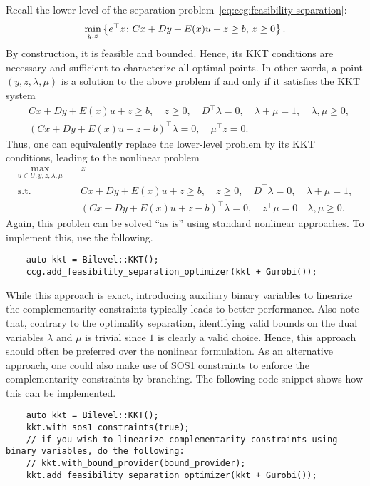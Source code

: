 
Recall the lower level of the separation
problem~\eqref{eq:ccg:feasibility-separation}:
\begin{equation*}
    \min_{y,z} \left\{ e^\top z \colon
        Cx + Dy + E(x)u + z \ge b, \, 
        z \ge 0
    \right\}.
\end{equation*}
By construction, it is feasible and bounded. Hence, its KKT conditions are
necessary and sufficient to characterize all optimal points. In other words, a
point $(y,z,\lambda,\mu)$ is a solution to the above problem if and only if it
satisfies the KKT system 
\begin{align*}
    & Cx + Dy + E(x)u + z \ge b, \quad z \ge 0, \quad 
    D^\top \lambda = 0, \quad \lambda + \mu = 1, \quad \lambda,\mu \ge 0, \\
    & (Cx + Dy + E(x)u + z - b)^\top\lambda = 0, \quad \mu^\top z = 0.
\end{align*}
Thus, one can equivalently replace the lower-level problem by its KKT
conditions, leading to the nonlinear problem 
\begin{align*}
    \max_{u\in U,y,z,\lambda,\mu} \quad & z \\
    \text{s.t.} \quad 
    & Cx + Dy + E(x)u + z \ge b, \quad z \ge 0, \quad 
    D^\top \lambda = 0, \quad \lambda + \mu = 1, \\
    & (Cx + Dy + E(x)u + z - b)^\top\lambda = 0, \quad z^\top\mu = 0 \quad \lambda,\mu \ge 0.
\end{align*}
Again, this problen can be solved ``as is'' using standard nonlinear
approaches. To implement this, use the following.
%
\begin{lstlisting}
    auto kkt = Bilevel::KKT();
    ccg.add_feasibility_separation_optimizer(kkt + Gurobi());
\end{lstlisting}

While this approach is exact, introducing auxiliary binary variables to
linearize the complementarity constraints typically leads to better
performance. Also note that, contrary to the optimality separation,
identifying valid bounds on the dual variables $\lambda$ and $\mu$ is trivial
since $1$ is clearly a valid choice. Hence, this approach should often be
preferred over the nonlinear formulation. As an alternative approach, one
could also make use of SOS1 constraints to enforce the complementarity
constraints by branching. The following code snippet shows how this can be
implemented.
%
\begin{lstlisting}
    auto kkt = Bilevel::KKT();
    kkt.with_sos1_constraints(true);
    // if you wish to linearize complementarity constraints using binary variables, do the following:
    // kkt.with_bound_provider(bound_provider); 
    kkt.add_feasibility_separation_optimizer(kkt + Gurobi());
\end{lstlisting} 

